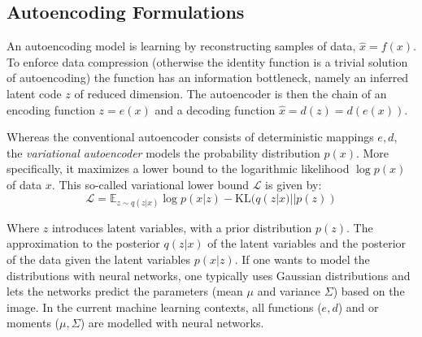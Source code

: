 	\subsection{Autoencoding Formulations}\label{sec:autoencoding}
		An autoencoding model is learning by reconstructing samples of data, $\hat x = f(x)$. To enforce data compression (otherwise the identity function is a trivial solution of autoencoding) the function has an information bottleneck, namely an inferred latent code $z$ of reduced dimension. The autoencoder is then the chain of an encoding function $z = e(x)$ and a decoding function $\hat x = d(z) = d(e(x))$.

		Whereas the conventional autoencoder consists of deterministic mappings $e, d$, the \textit{variational autoencoder} \cite{kingma16vae} models the probability distribution $p(x)$. More specifically, it maximizes a lower bound to the logarithmic likelihood $\log p(x)$ of data $x$. This so-called variational lower bound $\mathcal{L}$ is given by:
		\begin{equation}\label{eq:vae}
			\mathcal{L} = \mathds{E}_{z\sim q(z|x)}  \log p(x|z) - \textrm{KL}(q(z|x)||p(z))
		\end{equation}

		Where $z$ introduces latent variables, with a prior distribution $p(z)$. The approximation to the posterior $q(z|x)$ of the latent variables and the posterior of the data given the latent variables $p(x|z)$. If one wants to model the distributions with neural networks, one typically uses Gaussian distributions and lets the networks predict the parameters (mean $\mu$ and variance $\Sigma$) based on the image.
		In the current machine learning contexts, all functions ($e, d$) and or moments ($\mu, \Sigma$) are modelled with neural networks.

